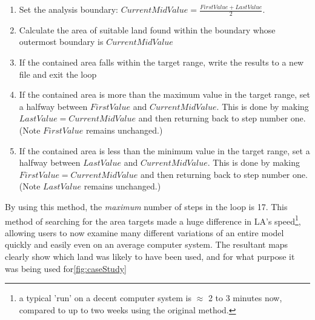   \begin{enumerate} 
  
  \item Set the analysis boundary: $CurrentMidValue=\frac{FirstValue +
  LastValue}{2}$.  
  
  \item Calculate the area of suitable land found within the boundary whose
  outermost boundary is $CurrentMidValue$ 
  
  \item If the contained area falls within the target range, write the results
  to a new file and exit the loop 
  
  \item If the contained area is more than the maximum value in the target
  range, set a halfway between $FirstValue$ and $CurrentMidValue$. This is done
  by making $LastValue=CurrentMidValue$ and then returning back to step number
  one.  (Note $FirstValue$ remains unchanged.) 
  
  \item If the contained area is less than the minimum value in the target
  range, set a halfway between $LastValue$ and $CurrentMidValue$. This is done
  by making $FirstValue=CurrentMidValue$ and then returning back to step number
  one.  (Note $LastValue$ remains unchanged.) 
  
  \end{enumerate}

By using this method, the \textit{maximum} number of steps in the loop is 17.
This method of searching for the area targets made a huge difference in LA's
speed\footnote{ a typical 'run' on a decent computer system is $\approx$ 2 to 3
minutes now, compared to up to two weeks using the original method.}, allowing
users to now examine many different variations of an entire model quickly and
easily even on an average computer system.  The resultant maps clearly show
which land was likely to have been used, and for what purpose it was being used
for\ref{fig:caseStudy}
 
